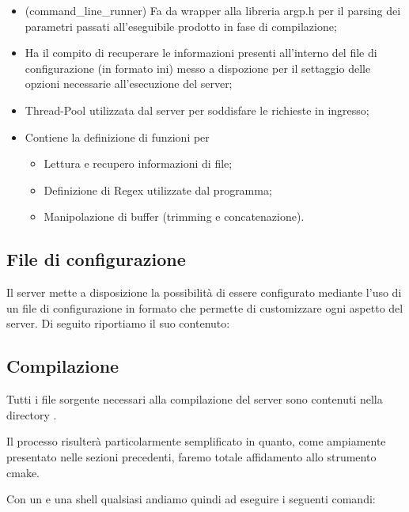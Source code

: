 \begin{minipage}{0.45\textwidth}
\begin{itemize}
        \item {} (command\_line\_runner) \rightarrow Fa da wrapper alla libreria argp.h per il parsing dei parametri passati all’eseguibile prodotto in fase di compilazione;
        \item {} \rightarrow Ha il compito di recuperare le informazioni presenti all’interno del file di configurazione (in formato ini) messo a dispozione per il settaggio delle opzioni necessarie all’esecuzione del server;
        \item {} \rightarrow Thread-Pool utilizzata dal server per soddisfare le richieste in ingresso;
        \item {} \rightarrow Contiene la definizione di funzioni per \begin{itemize} \item Lettura e recupero informazioni di file; \item Definizione di Regex utilizzate dal programma; \item Manipolazione di buffer (trimming e concatenazione). \end{itemize}
      \end{itemize}

    \end{minipage}

    \newpage
  \subsection{File di configurazione}
    Il server mette a disposizione la possibilità di essere configurato mediante l'uso di un file di configurazione in formato \href{https://it.wikipedia.org/wiki/File_INI}{} che permette di customizzare ogni aspetto del server. Di seguito riportiamo il suo contenuto:

    

  \subsection{Compilazione}
  Tutti i file sorgente necessari alla compilazione del server sono contenuti nella directory .

  Il processo risulterà particolarmente semplificato in quanto, come ampiamente presentato nelle sezioni precedenti, faremo totale affidamento allo strumento cmake.

  Con un \qterm e una shell qualsiasi andiamo quindi ad eseguire i seguenti comandi:

